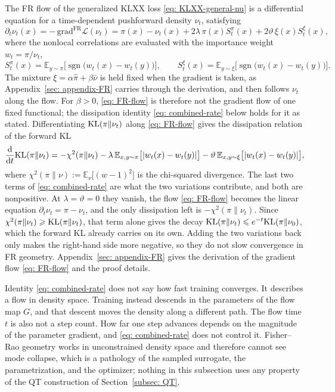 \documentclass{article}
\begin{document}
The FR flow of the generalized KLXX loss \eqref{eq: KLXX-general-nu} is a differential equation for a time-dependent pushforward density $\nu_t$, satisfying
\begin{equation}
	\partial_t\nu_t(x) = -\,\mathrm{grad}^{\mathrm{FR}}\mathcal L(\nu_t) = \pi(x)-\nu_t(x) + 2\lambda\,\pi(x)S^{\pi}_t(x) + 2\vartheta\,\xi(x)S^{\xi}_t(x),
	\label{eq: FR-flow}
\end{equation}
where the nonlocal correlations are evaluated with the importance weight $w_t=\pi/\nu_t$,
\begin{equation}
	S^{\pi}_t(x) = \mathbb E_{y\sim\pi}\bigl[\operatorname{sgn}\bigl(w_t(x)-w_t(y)\bigr)\bigr],
	\qquad
	S^{\xi}_t(x) = \mathbb E_{y\sim\xi}\bigl[\operatorname{sgn}\bigl(w_t(x)-w_t(y)\bigr)\bigr].
	\label{eq: FR-S-t}
\end{equation}
The mixture $\xi=\alpha\hat\pi+\beta\bar\nu$ is held fixed when the gradient is taken, as Appendix~\ref{sec: appendix-FR} carries through the derivation, and then follows $\nu_t$ along the flow. For $\beta>0$, \eqref{eq: FR-flow} is therefore not the gradient flow of one fixed functional; the dissipation identity \eqref{eq: combined-rate} below holds for it as stated.
Differentiating $\mathrm{KL}(\pi\|\nu_t)$ along \eqref{eq: FR-flow} gives the dissipation relation of the forward KL
\begin{equation}
	\frac{\mathrm{d}}{\mathrm{d} t}\mathrm{KL}(\pi\|\nu_t) = -\chi^2(\pi\|\nu_t)
	- \lambda\,\mathbb E_{x,y\sim\pi}\bigl[|w_t(x)-w_t(y)|\bigr]
	- \vartheta\,\mathbb E_{x,y\sim\xi}\bigl[|w_t(x)-w_t(y)|\bigr],
	\label{eq: combined-rate}
\end{equation}
where $\chi^2(\pi\|\nu):=\mathbb E_{\nu}\bigl[(w-1)^2\bigr]$ is the chi-squared divergence. The last two terms of \eqref{eq: combined-rate} are what the two variations contribute, and both are nonpositive. At $\lambda=\vartheta=0$ they vanish, the flow \eqref{eq: FR-flow} becomes the linear equation $\partial_t\nu_t=\pi-\nu_t$, and the only dissipation left is $-\chi^2(\pi\|\nu_t)$. Since $\chi^2(\pi\|\nu_t)\geqslant\mathrm{KL}(\pi\|\nu_t)$, that term alone gives the decay $\mathrm{KL}(\pi\|\nu_t)\leqslant e^{-t}\mathrm{KL}(\pi\|\nu_0)$, which the forward KL already carries on its own. Adding the two variations back only makes the right-hand side more negative, so they do not slow convergence in FR geometry. Appendix~\ref{sec: appendix-FR} gives the derivation of the gradient flow \eqref{eq: FR-flow} and the proof details.

\begin{remark}
	Identity \eqref{eq: combined-rate} does not say how fast training converges. It describes a flow in density space. Training instead descends in the parameters of the flow map $G$, and that descent moves the density along a different path. The flow time $t$ is also not a step count. How far one step advances depends on the magnitude of the parameter gradient, and \eqref{eq: combined-rate} does not control it. Fisher--Rao geometry works in unconstrained density space and therefore cannot see mode collapse, which is a pathology of the sampled surrogate, the parametrization, and the optimizer; nothing in this subsection uses any property of the QT construction of Section~\ref{subsec: QT}.
\end{remark}
\end{document}
